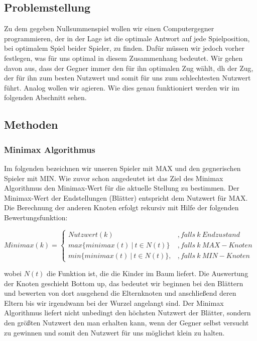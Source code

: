 \subsection{Problemstellung}
Zu dem gegeben Nullsummenspiel wollen wir einen Computergegner programmieren, der in der Lage ist die optimale Antwort auf jede Spielposition, bei optimalem Spiel beider Spieler, zu finden.
Dafür müssen wir jedoch vorher festlegen, was für uns optimal in diesem Zusammenhang bedeutet. Wir gehen davon aus, dass der Gegner immer den für ihn optimalen Zug wählt, dh der Zug, der für ihn zum besten Nutzwert und somit für uns zum schlechtesten Nutzwert führt. Analog wollen wir agieren. Wie dies genau funktioniert werden wir im folgenden Abschnitt sehen.



\subsection{Methoden}


\subsubsection*{Minimax Algorithmus}
Im folgenden bezeichnen wir unseren Spieler mit MAX und den gegnerischen Spieler mit MIN. Wie zuvor schon angedeutet ist das Ziel des Minimax Algorithmus den Minimax-Wert für die aktuelle Stellung zu bestimmen. Der Minimax-Wert der Endstellungen (Blätter) entspricht dem Nutzwert für MAX. Die Berechnung der anderen Knoten erfolgt rekursiv mit Hilfe der folgenden Bewertungsfunktion:

\begin{center}
	$Minimax(k) = \begin{cases} Nutzwert(k) &		,falls~ k ~Endzustand\\
		max\{minimax(t) ~|~ t \in N(t)\} 	&		,falls~ k~ MAX-Knoten\\
		min\{minimax(t) ~|~ t \in N(t)\},	&		,falls~ k~ MIN-Knoten	\end{cases} $
\end{center}

wobei $N(t)$ die Funktion ist, die die Kinder im Baum liefert. Die Auswertung der Knoten geschieht Bottom up, das bedeutet wir beginnen bei den Blättern und bewerten von dort ausgehend die Elternknoten und anschließend deren Eltern bis wir irgendwann bei der Wurzel angelangt sind. Der Minimax Algorithmus liefert nicht unbedingt den höchsten Nutzwert der Blätter, sondern den größten Nutzwert den man erhalten kann, wenn der Gegner selbst versucht zu gewinnen und somit den Nutzwert für uns möglichst klein zu halten.\\


